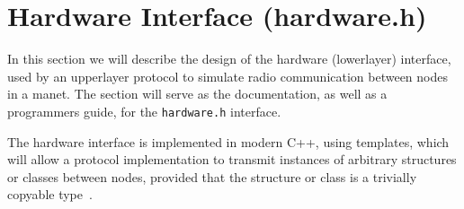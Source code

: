 \section{Hardware Interface (hardware.h)}\label{sec:hardwareinterface}
In this section we will describe the design of the hardware (\gls{lowerlayer}) interface, used by an \gls{upperlayer} protocol to simulate radio communication between nodes in a \gls{manet}. The section will serve as the documentation, as well as a programmers guide, for the \texttt{hardware.h} interface.\medbreak

The hardware interface is implemented in modern C++, using templates, which will allow a protocol implementation to transmit instances of arbitrary structures or classes between nodes, provided that the structure or class is a trivially copyable type~\cite{website:cpptriviallycopyable}.

